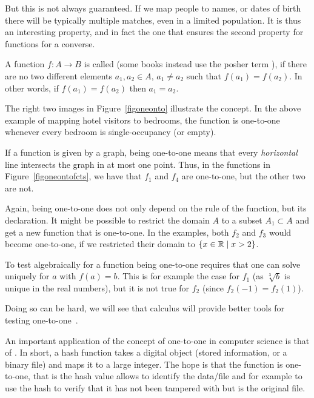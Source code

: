 But this is not always guaranteed. If we map people to names, or dates of birth there
will be typically multiple matches, even in a limited population. It is thus an
interesting property, and in fact the one that ensures the second property for functions
for a converse.

\begin{defn}
A function $f\colon A\to B$ is called  (some books instead use the posher
term ), if there are no two different elements $a_1,a_2\in A$,
$a_1\not=a_2$ such that $f(a_1)=f(a_2)$. In other words, if $f(a_1)=f(a_2)$ then
$a_1=a_2$.
\end{defn}

The right two images in Figure~\ref{figoneonto} illustrate the concept.
In the above example of mapping hotel visitors to bedrooms, the function is one-to-one
whenever every bedroom is single-occupancy (or empty).
\medskip

If a function is given by a graph, being one-to-one means that every {\em horizontal}
line intersects the graph in at most one point. Thus,
in the functions in Figure~\ref{figoneontofcts}, we have that $f_1$ and $f_4$ are
one-to-one, but the other two are not.

Again, being one-to-one does not only depend on the rule of the function, but its
declaration. It might be possible to restrict the domain $A$ to a subset $A_1\subset A$
and get a new function that is one-to-one. In the examples, both $f_2$ and $f_3$ would
become one-to-one, if we restricted their domain to $\{x\in{\mathbb R}\mid x>2\}$.
\medskip

To test algebraically for a function being one-to-one requires that one can solve
uniquely for $a$ with $f(a)=b$. This is for example the case for $f_1$ (as
$\sqrt[3]{b}$ is unique in the real numbers), but it is not true for $f_2$ (since
$f_2(-1)=f_2(1)$).

Doing so can be hard, we will see that calculus will provide better tools
for testing one-to-one~.

An important application of the concept of one-to-one in computer science is
that of . In short, a hash function takes a digital
object (stored information, or a binary file) and maps it to a large
integer. The hope is that the function is one-to-one, that is the hash value allows to
identify the data/file and for example to use the hash to verify that it has
not been tampered with but is the original file.


